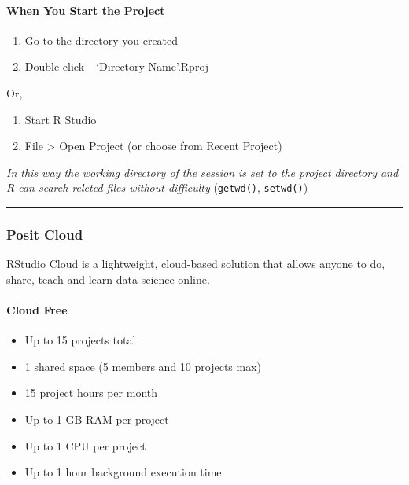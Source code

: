 \documentclass[
]{article}
\providecommand{\tightlist}{%
  \setlength{\itemsep}{0pt}\setlength{\parskip}{0pt}}
\begin{document}
\hypertarget{when-you-start-the-project}{%
\paragraph{When You Start the
Project}\label{when-you-start-the-project}}

\begin{enumerate}
\def\labelenumi{\arabic{enumi}.}
\tightlist
\item
  Go to the directory you created
\item
  Double click \_`Directory Name'.Rproj
\end{enumerate}

Or,

\begin{enumerate}
\def\labelenumi{\arabic{enumi}.}
\tightlist
\item
  Start R Studio
\item
  File \textgreater{} Open Project (or choose from Recent Project)
\end{enumerate}

\emph{In this way the working directory of the session is set to the
project directory and R can search releted files without difficulty}
(\texttt{getwd()}, \texttt{setwd()})

\begin{center}\rule{0.5\linewidth}{0.5pt}\end{center}

\hypertarget{posit-cloud}{%
\subsubsection{Posit Cloud}\label{posit-cloud}}

RStudio Cloud is a lightweight, cloud-based solution that allows anyone
to do, share, teach and learn data science online.

\hypertarget{cloud-free}{%
\paragraph{Cloud Free}\label{cloud-free}}

\begin{itemize}
\tightlist
\item
  Up to 15 projects total
\item
  1 shared space (5 members and 10 projects max)
\item
  15 project hours per month
\item
  Up to 1 GB RAM per project
\item
  Up to 1 CPU per project
\item
  Up to 1 hour background execution time
\end{itemize}
\end{document}
